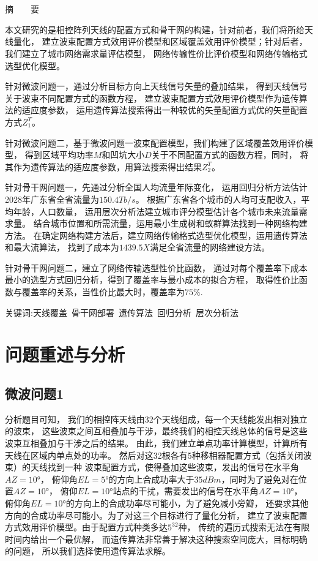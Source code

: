 \documentclass[UTF8,12pt]{ctexart}
\begin{document}
\section*{}%
    \centerline{\textsf{摘\ \ \ \ 要}}
    本文研究的是相控阵列天线的配置方式和骨干网的构建，针对前者，我们将所给天线量化，
    建立波束配置方式效用评价模型和区域覆盖效用评价模型；针对后者，
    我们建立了城市网络需求量评估模型，
    网络传输性价比评价模型和网络传输格式选型优化模型。\par
    针对微波问题一，通过分析目标方向上天线信号矢量的叠加结果，
    得到天线信号关于波束不同配置方式的函数方程，
    建立波束配置方式效用评价模型作为遗传算法的适应度参数，
    运用遗传算法搜索得出一种较优的矢量配置方式优的矢量配置方式$Z_1^{T}$。\par
    针对微波问题二，基于微波问题一波束配置模型，我们构建了区域覆盖效用评价模型，
    得到区域平均功率$M$和凹坑大小$D$关于不同配置方式的函数方程，同时，
    将其作为遗传算法的适应度参数，用算法搜索得出结果$Z_2^{T}$。\par
    针对骨干网问题一，先通过分析全国人均流量年际变化，
    运用回归分析方法估计2028年广东省全省流量为$150.4Tb/s$。
    根据广东省各个城市的人均可支配收入，平均年龄，人口数量，
    运用层次分析法建立城市评分模型估计各个城市未来流量需求量。
    结合城市位置和所需流量，运用最小生成树和蚁群算法找到一种网络构建方法。
    在确定网络构建方法后，建立网络传输格式选型优化模型，运用遗传算法和最大流算法，
    找到了成本为$1439.5X$满足全省流量的网络建设方法。\par
    针对骨干网问题二，建立了网络传输选型性价比函数，
    通过对每个覆盖率下成本最小的选型方式回归分析，得到了覆盖率与最小成本的拟合方程，
    取得性价比函数与覆盖率的关系，当性价比最大时，覆盖率为$75\%$.\par

\textsf{关键词:天线覆盖\ 骨干网部署\ 遗传算法\ 回归分析\ 层次分析法}
\newpage



\section{问题重述与分析}
    \subsection{微波问题1}分析题目可知，
        我们的相控阵天线由32个天线组成，每一个天线能发出相对独立的波束，
        这些波束之间互相叠加与干涉，最终我们的相控天线总体的信号是这些波束互相叠加与干涉之后的结果。
        由此，我们建立单点功率计算模型，计算所有天线在区域内单点处的功率。
        然后对这32根各有5种移相器配置方式（包括关闭波束）的天线找到一种
        波束配置方式，使得叠加这些波束，发出的信号在水平角$AZ = 10°$，
        俯仰角$EL= 5°$的方向上合成功率大于$35dBm$，同时为了避免对在位置$AZ=10°$，
        俯仰$EL=10°$站点的干扰，需要发出的信号在水平角$AZ=10°$，
        俯仰角$EL=10°$的方向上的合成功率尽可能小，为了避免减小旁瓣，
        还要求其他方向的合成功率尽可能小。为了对这三个目标进行了量化分析，
        建立了波束配置方式效用评价模型。由于配置方式种类多达$5^{32}$种，
        传统的遍历式搜索无法在有限时间内给出一个最优解，
        而遗传算法非常善于解决这种搜索空间庞大，目标明确的问题，
        所以我们选择使用遗传算法求解。
\end{document}
